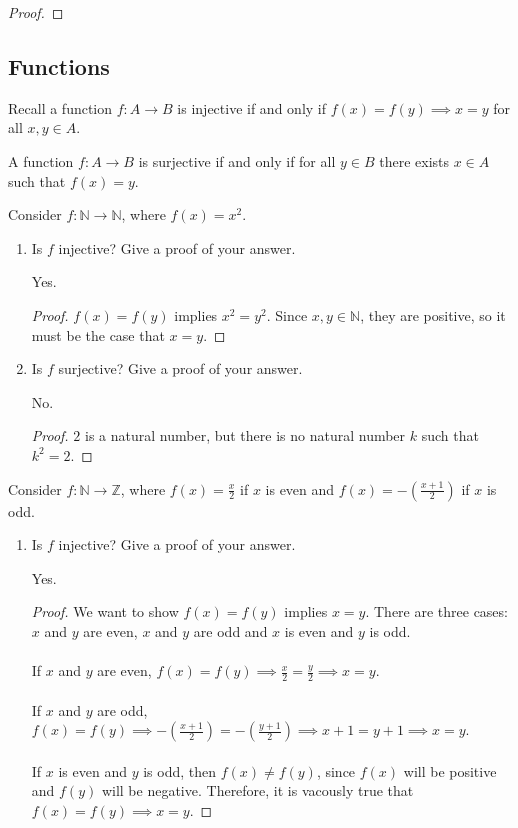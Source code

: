 \documentclass[]{exam}
\theoremstyle{definition}
\newcommand{\bb}[1]{\mathbb{#1}}
\newcommand{\Z}{\bb{Z}}
\newcommand{\N}{\bb{N}}
\begin{document}
\begin{questions}
\begin{solution}
\begin{proof}
\end{proof}

\end{solution}


\subsection*{Functions}
Recall a function $f: A \to B$ is injective if and only if $f(x) = f(y) \implies
x = y$ for all $x,y \in A$.

A function $f: A \to B$ is surjective if and only if for all $y \in B$ there
exists $x \in A$ such that $f(x) = y$. 

\question Consider $f: \N \to \N$, where $f(x) = x^2$.

\begin{enumerate}[label=\alph*)]
\item Is $f$ injective? Give a proof of your answer.
\begin{solution}
Yes.
\begin{proof}
$f(x) = f(y)$ implies $x^2 = y^2$. Since $x,y \in \N$, they
are positive, so it must be the case that $x = y$.
\end{proof}


\end{solution}

\item Is $f$ surjective? Give a proof of your answer.
\begin{solution}
No.
\begin{proof}
$2$ is a natural number, but there is no natural number $k$ such that
$k^2 = 2$.
\end{proof}
\end{solution}

\end{enumerate}


\question Consider $f: \N \to \Z$, where $f(x) = \frac{x}{2}$ if $x$ is even
and $f(x) = -\left (\frac{x+1}{2} \right) $ if $x$ is odd.
\begin{enumerate}[label=\alph*)]
\item Is $f$ injective? Give a proof of your answer.
\begin{solution}
Yes.
\begin{proof}
We want to show $f(x) = f(y)$ implies $x = y$. There are three cases:
$x$ and $y$ are even, $x$ and $y$ are odd and $x$ is even and $y$ is odd.
\\~\\
If $x$ and $y$ are even, $f(x) = f(y) \implies \frac{x}{2} = \frac{y}{2}
\implies x = y$.
\\~\\
If $x$ and $y$ are odd, 
$f(x) = f(y) \implies - \left (\frac{x + 1}{2} \right ) = - \left (\frac{y + 1}{2} \right
    ) \implies x + 1 = y + 1 \implies x = y$.
\\~\\
If $x$ is even and $y$ is odd, then $f(x) \neq f(y)$, since $f(x)$ will be
positive and $f(y)$ will be negative. Therefore, it is vacously true that
$f(x) = f(y) \implies x = y$.
\end{proof}



\end{solution}
\end{enumerate}
\end{questions}
\end{document}

